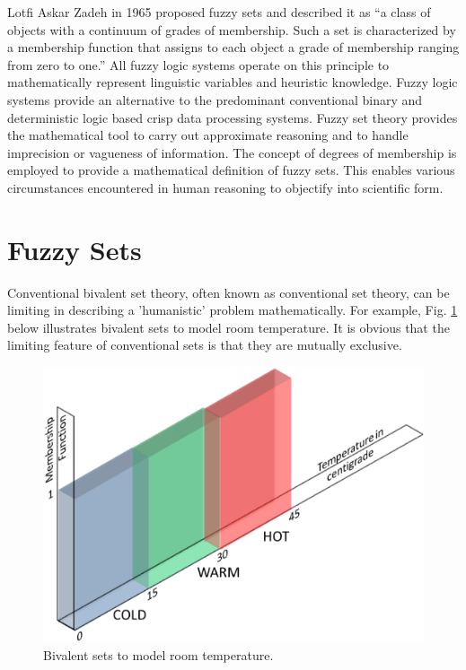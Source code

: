 Lotfi Askar Zadeh in 1965 \cite{zadeh1965fuzzy} proposed fuzzy sets and described it as ``a class of objects with a continuum of grades of membership. Such a set is characterized by a membership function that assigns to each object a grade of membership ranging from zero to one.'' All fuzzy logic systems operate on this principle to mathematically represent linguistic variables and heuristic knowledge. Fuzzy logic systems provide an alternative to the predominant conventional binary and deterministic logic based crisp data processing systems. Fuzzy set theory provides the mathematical tool to carry out approximate reasoning and to handle imprecision or vagueness of information. The concept of degrees of membership is employed to provide a mathematical definition of fuzzy sets. This enables various circumstances encountered in human reasoning to objectify into scientific form.

\section{Fuzzy Sets}
Conventional bivalent set theory, often known as conventional set theory,  can be limiting in describing a 'humanistic' problem mathematically. For example, Fig. \ref{fig:Fig4_b_set} below illustrates bivalent sets to model room temperature. It is obvious that the limiting feature of conventional sets is that they are mutually exclusive.
\begin{figure}[h]
\centering
\includegraphics[width=0.8\linewidth]{Chapter1/chapter1/Fig4_b_set}
\caption{Bivalent sets to model room temperature.}
\label{fig:Fig4_b_set}
\end{figure}

